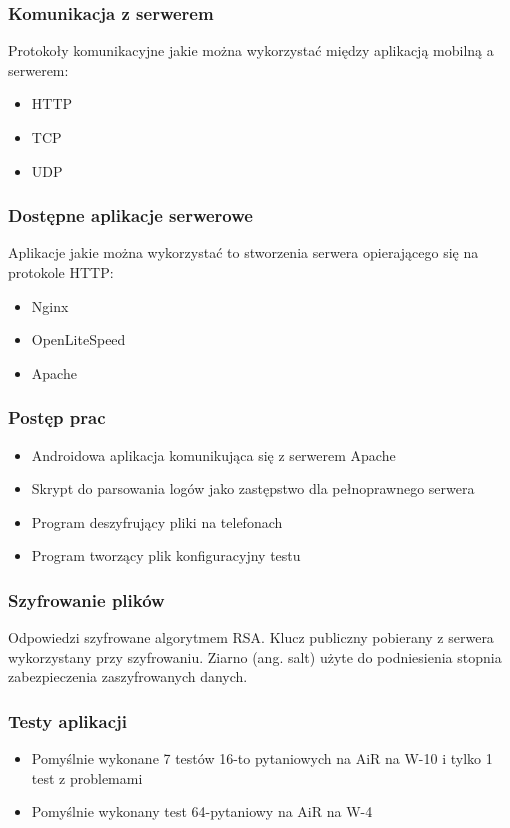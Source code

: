 \documentclass{beamer}
\begin{document}
  \begin{frame}
	\frametitle{Komunikacja z serwerem}
	Protokoły komunikacyjne jakie można wykorzystać między aplikacją mobilną a serwerem:
	\begin{itemize}
		\item HTTP
		\item TCP
		\item UDP
	\end{itemize}
  \end{frame}

  \begin{frame}
    \frametitle{Dostępne aplikacje serwerowe}
    Aplikacje jakie można wykorzystać to stworzenia serwera opierającego się na protokole HTTP:\\
    \begin{itemize}
    \item Nginx
    \item OpenLiteSpeed
    \item Apache
    \end{itemize}
  \end{frame}

  \begin{frame}
    \frametitle{Postęp prac}
    \begin{itemize}
    \item Androidowa aplikacja komunikująca się z serwerem Apache
    \item Skrypt do parsowania logów jako zastępstwo dla pełnoprawnego serwera
    \item Program deszyfrujący pliki na telefonach
    \item Program tworzący plik konfiguracyjny testu
    \end{itemize}
  \end{frame}

  \begin{frame}
	\frametitle{Szyfrowanie plików}
	Odpowiedzi szyfrowane algorytmem RSA. Klucz publiczny pobierany z serwera wykorzystany przy szyfrowaniu. Ziarno (ang. salt) użyte do podniesienia stopnia zabezpieczenia zaszyfrowanych danych.
  \end{frame}

  \begin{frame}
    \frametitle{Testy aplikacji}
    \begin{itemize}
    \item Pomyślnie wykonane 7 testów 16-to pytaniowych na AiR na W-10 i tylko 1 test z problemami
    \item Pomyślnie wykonany test 64-pytaniowy na AiR na W-4
    \end{itemize}
  \end{frame}
\end{document}
